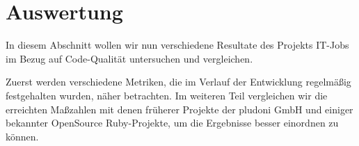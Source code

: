 \chapter{Auswertung}
\label{sec:auswertung}

In diesem Abschnitt wollen wir nun verschiedene Resultate des Projekts IT-Jobs im Bezug auf Code-Qualität untersuchen und vergleichen.

Zuerst werden verschiedene Metriken, die im Verlauf der Entwicklung regelmäßig festgehalten wurden, näher betrachten. Im weiteren Teil vergleichen wir die erreichten Maßzahlen mit denen früherer Projekte der pludoni GmbH und einiger bekannter OpenSource Ruby-Projekte, um die Ergebnisse besser einordnen zu können.








